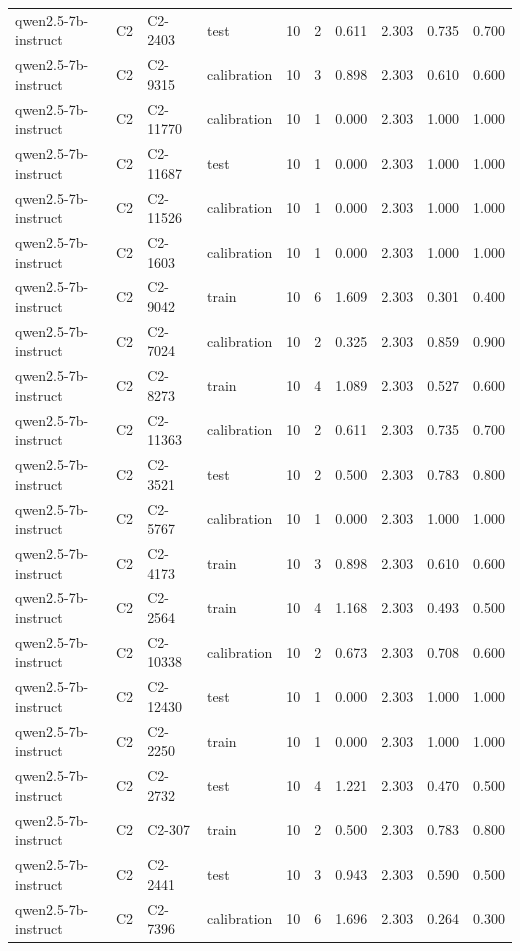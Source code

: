 \begin{table}
\begin{tabular}{llllrrrrrr}
qwen2.5-7b-instruct & C2 & C2-2403 & test & 10 & 2 & 0.611 & 2.303 & 0.735 & 0.700 \\
qwen2.5-7b-instruct & C2 & C2-9315 & calibration & 10 & 3 & 0.898 & 2.303 & 0.610 & 0.600 \\
qwen2.5-7b-instruct & C2 & C2-11770 & calibration & 10 & 1 & 0.000 & 2.303 & 1.000 & 1.000 \\
qwen2.5-7b-instruct & C2 & C2-11687 & test & 10 & 1 & 0.000 & 2.303 & 1.000 & 1.000 \\
qwen2.5-7b-instruct & C2 & C2-11526 & calibration & 10 & 1 & 0.000 & 2.303 & 1.000 & 1.000 \\
qwen2.5-7b-instruct & C2 & C2-1603 & calibration & 10 & 1 & 0.000 & 2.303 & 1.000 & 1.000 \\
qwen2.5-7b-instruct & C2 & C2-9042 & train & 10 & 6 & 1.609 & 2.303 & 0.301 & 0.400 \\
qwen2.5-7b-instruct & C2 & C2-7024 & calibration & 10 & 2 & 0.325 & 2.303 & 0.859 & 0.900 \\
qwen2.5-7b-instruct & C2 & C2-8273 & train & 10 & 4 & 1.089 & 2.303 & 0.527 & 0.600 \\
qwen2.5-7b-instruct & C2 & C2-11363 & calibration & 10 & 2 & 0.611 & 2.303 & 0.735 & 0.700 \\
qwen2.5-7b-instruct & C2 & C2-3521 & test & 10 & 2 & 0.500 & 2.303 & 0.783 & 0.800 \\
qwen2.5-7b-instruct & C2 & C2-5767 & calibration & 10 & 1 & 0.000 & 2.303 & 1.000 & 1.000 \\
qwen2.5-7b-instruct & C2 & C2-4173 & train & 10 & 3 & 0.898 & 2.303 & 0.610 & 0.600 \\
qwen2.5-7b-instruct & C2 & C2-2564 & train & 10 & 4 & 1.168 & 2.303 & 0.493 & 0.500 \\
qwen2.5-7b-instruct & C2 & C2-10338 & calibration & 10 & 2 & 0.673 & 2.303 & 0.708 & 0.600 \\
qwen2.5-7b-instruct & C2 & C2-12430 & test & 10 & 1 & 0.000 & 2.303 & 1.000 & 1.000 \\
qwen2.5-7b-instruct & C2 & C2-2250 & train & 10 & 1 & 0.000 & 2.303 & 1.000 & 1.000 \\
qwen2.5-7b-instruct & C2 & C2-2732 & test & 10 & 4 & 1.221 & 2.303 & 0.470 & 0.500 \\
qwen2.5-7b-instruct & C2 & C2-307 & train & 10 & 2 & 0.500 & 2.303 & 0.783 & 0.800 \\
qwen2.5-7b-instruct & C2 & C2-2441 & test & 10 & 3 & 0.943 & 2.303 & 0.590 & 0.500 \\
qwen2.5-7b-instruct & C2 & C2-7396 & calibration & 10 & 6 & 1.696 & 2.303 & 0.264 & 0.300 \\

\end{tabular}
\end{table}
